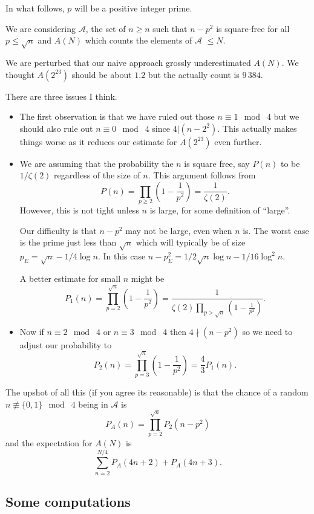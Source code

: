 \documentclass[leqno,a4paper]{article}
\begin{document}
In what follows, $p$ will be a positive integer prime.

We are considering $\mathcal{A}$, the set of $n\geq n$ such that $n-p^2$ is square-free for all $p\leq\sqrt{n}$ and $A(N)$ which counts the elements of $\mathcal{A}$ $\leq N$.

We are perturbed that our naive approach grossly underestimated $A(N)$. We thought $A(2^23)$ should be about $1.2$ but the actually count is $9\,384$.

There are three issues I think.
\begin{itemize}

\item The first observation is that we have ruled out those $n\equiv 1\mod\;4$ but we should also rule out $n\equiv 0\mod\;4$ since $4|(n-2^2)$. This actually makes things worse as it reduces our estimate for $A(2^{23})$ even further.
  
  \item We are assuming that the probability the $n$ is square free, say $P(n)$ to be $1/\zeta(2)$ regardless of the size of $n$. This argument follows from
$$
P(n)=\prod\limits_{p\geq 2}\left(1-\frac{1}{p^2}\right)=\frac{1}{\zeta(2)}.
$$
However, this is not tight unless $n$ is large, for some definition of ``large''.

Our difficulty is that $n-p^2$ may not be large, even when $n$ is. The worst case is the prime just less than $\sqrt{n}$ which will typically be of size $p_E=\sqrt{n}-1/4\log n$. In this case $n-p_E^2=1/2\sqrt{n}\log n-1/16\log^2 n$. 

A better estimate for small $n$ might be
$$
P_1(n)=\prod\limits_{p=2}^{\sqrt{n}}\left(1-\frac{1}{p^2}\right)=\frac{1}{\zeta(2)\prod\limits_{p>\sqrt{n}}\left(1-\frac{1}{p^2}\right)}.
$$

\item
Now if $n\equiv 2\mod\;4$ or $n\equiv 3\mod\;4$ then $4\nmid(n-p^2)$ so we need to adjust our probability to
$$
P_2(n)=\prod\limits_{p=3}^{\sqrt{n}}\left(1-\frac{1}{p^2}\right)=\frac{4}{3}P_1(n).
$$
\end{itemize}

The upshot of all this (if you agree its reasonable) is that the chance of a random $n\not\equiv \{0,1\}\mod\;4$ being in $\mathcal{A}$ is
$$
P_{A}(n)=\prod\limits_{p=2}^{\sqrt{n}}P_2(n-p^2)
$$
and the expectation for $A(N)$ is
$$
\sum\limits_{n=2}^{N/4} P_A(4n+2)+P_A(4n+3).
$$


\subsection{Some computations}
\end{document}
